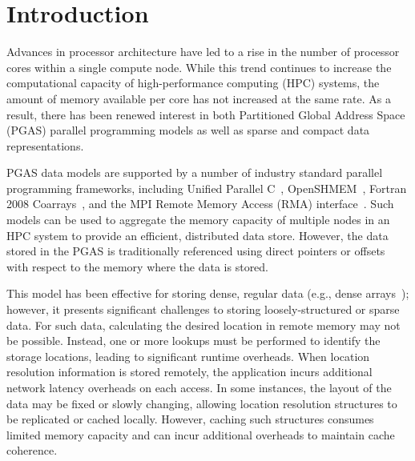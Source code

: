 \section{Introduction}

Advances in processor architecture have led to a rise in the number of
processor cores within a single compute node.  While this trend continues to
increase the computational capacity of high-performance computing (HPC)
systems, the amount of memory available per core has not increased at the same
rate.  As a result, there has been renewed interest in both Partitioned Global
Address Space (PGAS) parallel programming models as well as sparse and compact
data representations.

PGAS data models are supported by a number of industry standard parallel
programming frameworks, including Unified Parallel C~\cite{upc-13-spec},
OpenSHMEM~\cite{openshmem-1.3}, Fortran 2008 Coarrays~\cite{reid:08}, and the MPI
Remote Memory Access (RMA) interface~\cite{mpi-forum:15}.  Such models can be used
to aggregate the memory capacity of multiple nodes in an HPC system to provide
an efficient, distributed data store.  However, the data stored in the PGAS is
traditionally referenced using direct pointers or offsets with respect to the
memory where the data is stored.

This model has been effective for storing dense, regular data (e.g., dense
arrays~\cite{ga}); however, it presents significant challenges to
storing loosely-structured or sparse data.  For such data, calculating the
desired location in remote memory may not be possible.  Instead, one or more
lookups must be performed to identify the storage locations, leading to
significant runtime overheads.  When location resolution information is stored
remotely, the application incurs additional network latency overheads on each
access.  In some instances, the layout of the data may be fixed or slowly
changing, allowing location resolution structures to be replicated or cached
locally.  However, caching such structures consumes limited memory capacity and
can incur additional overheads to maintain cache coherence.


